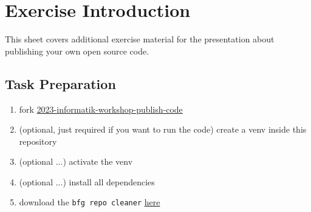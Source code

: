 \documentclass[paper=a4]{scrartcl}
\newcommand{\theexercisenumber}{1} %
\newcommand{\thedate}{September 27, 2023} %
\begin{document}
\date{\thedate}
\exercise{\theexercisenumber}

\parskip 8pt
\makesheetheader

\section*{Exercise Introduction}
This sheet covers additional exercise material for the presentation about publishing your own open source code.

\tableofcontents

\bigskip


	\subsection*{Task Preparation}
		\begin{enumerate}
			\item fork \href{https://github.com/marc-philipp-knechtle/2023-informatik-workshop-publish-code}{2023-informatik-workshop-publish-code}
			\item (optional, just required if you want to run the code) create a venv inside this repository
			\item (optional ...) activate the venv
			\item (optional ...) install all dependencies
			\item download the \texttt{bfg repo cleaner} \href{https://rtyley.github.io/bfg-repo-cleaner/}{here}
		\end{enumerate}
\end{document}
